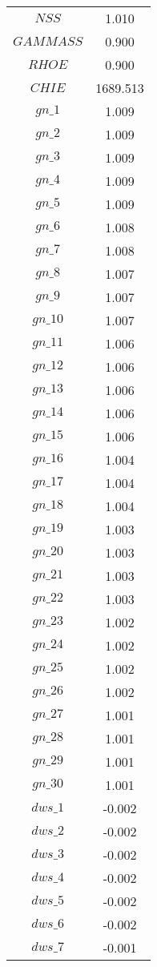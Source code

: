 \begin{center}
\begin{longtable}{cc}
$NSS$ 	 & 	 1.010 \\
$GAMMASS$ 	 & 	 0.900 \\
$RHOE$ 	 & 	 0.900 \\
$CHIE$ 	 & 	 1689.513 \\
$gn\_1$ 	 & 	 1.009 \\
$gn\_2$ 	 & 	 1.009 \\
$gn\_3$ 	 & 	 1.009 \\
$gn\_4$ 	 & 	 1.009 \\
$gn\_5$ 	 & 	 1.009 \\
$gn\_6$ 	 & 	 1.008 \\
$gn\_7$ 	 & 	 1.008 \\
$gn\_8$ 	 & 	 1.007 \\
$gn\_9$ 	 & 	 1.007 \\
$gn\_10$ 	 & 	 1.007 \\
$gn\_11$ 	 & 	 1.006 \\
$gn\_12$ 	 & 	 1.006 \\
$gn\_13$ 	 & 	 1.006 \\
$gn\_14$ 	 & 	 1.006 \\
$gn\_15$ 	 & 	 1.006 \\
$gn\_16$ 	 & 	 1.004 \\
$gn\_17$ 	 & 	 1.004 \\
$gn\_18$ 	 & 	 1.004 \\
$gn\_19$ 	 & 	 1.003 \\
$gn\_20$ 	 & 	 1.003 \\
$gn\_21$ 	 & 	 1.003 \\
$gn\_22$ 	 & 	 1.003 \\
$gn\_23$ 	 & 	 1.002 \\
$gn\_24$ 	 & 	 1.002 \\
$gn\_25$ 	 & 	 1.002 \\
$gn\_26$ 	 & 	 1.002 \\
$gn\_27$ 	 & 	 1.001 \\
$gn\_28$ 	 & 	 1.001 \\
$gn\_29$ 	 & 	 1.001 \\
$gn\_30$ 	 & 	 1.001 \\
$dws\_1$ 	 & 	 -0.002 \\
$dws\_2$ 	 & 	 -0.002 \\
$dws\_3$ 	 & 	 -0.002 \\
$dws\_4$ 	 & 	 -0.002 \\
$dws\_5$ 	 & 	 -0.002 \\
$dws\_6$ 	 & 	 -0.002 \\
$dws\_7$ 	 & 	 -0.001 \\

\end{longtable}
\end{center}
